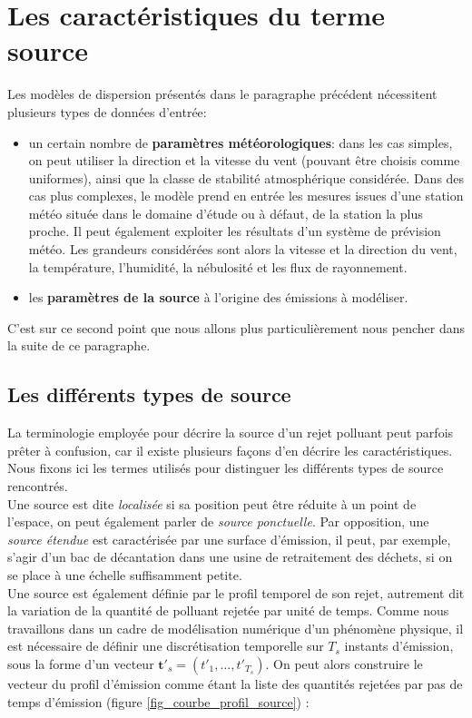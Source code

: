 	
	\section{Les caractéristiques du terme source}
	
	Les modèles de dispersion présentés dans le paragraphe précédent nécessitent plusieurs types de données d'entrée: 
	\begin{itemize}
		\item un certain nombre de \textbf{paramètres météorologiques}: dans les cas simples, on peut utiliser la direction et la vitesse du vent (pouvant être choisis comme uniformes), ainsi que la classe de stabilité atmosphérique considérée. Dans des cas plus complexes, le modèle prend en entrée les mesures issues d'une station météo située dans le domaine d'étude ou à défaut, de la station la plus proche. Il peut également exploiter les résultats d'un système de prévision météo. Les grandeurs considérées sont alors la vitesse et la direction du vent, la température, l'humidité, la nébulosité et les flux de rayonnement.
		\item les \textbf{paramètres de la source} à l'origine des émissions à modéliser.
	\end{itemize}
	
	C'est sur ce second point que nous allons plus particulièrement nous pencher dans la suite de ce paragraphe.
	
	\subsection{Les différents types de source}
	
	La terminologie employée pour décrire la source d'un rejet polluant peut parfois prêter à confusion, car il existe plusieurs façons d'en décrire les caractéristiques. Nous fixons ici les termes utilisés pour distinguer les différents types de source rencontrés.\\
	
	Une source est dite \textit{localisée} si sa position peut être réduite à un point de l'espace, on peut également parler de \textit{source ponctuelle}. Par opposition, une \textit{source étendue} est caractérisée par une surface d'émission, il peut, par exemple, s'agir d'un bac de décantation dans une usine de retraitement des déchets, si on se place à une échelle suffisamment petite.\\
	
	Une source est également définie par le profil temporel de son rejet, autrement dit la variation de la quantité de polluant rejetée par unité de temps. Comme nous travaillons dans un cadre de modélisation numérique d'un phénomène physique, il est nécessaire de définir une discrétisation temporelle sur $T_s$ instants d'émission, sous la forme d'un vecteur $\bm{t'}_s = (t'_1, \dots, t'_{T_s})$. On peut alors construire le vecteur du profil d'émission comme étant la liste des quantités rejetées par pas de temps d'émission (figure \ref{fig_courbe_profil_source}) : 
	

